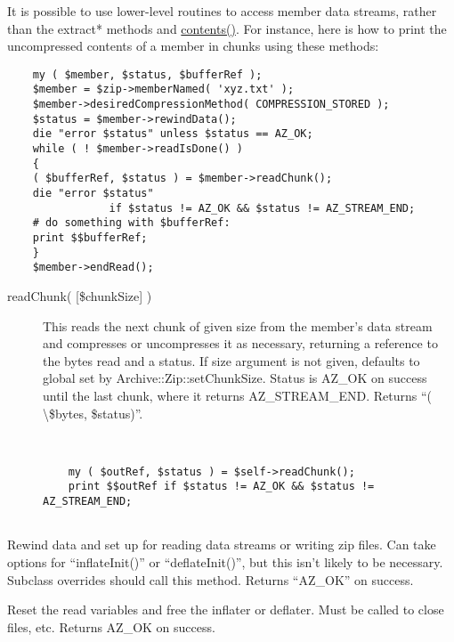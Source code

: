 \documentclass[]{article}
\renewcommand{\emph}[1]{\underline{#1}}
\begin{document}
It is possible to use lower-level routines to access member data
streams, rather than the extract* methods and \emph{contents()}. For
instance, here is how to print the uncompressed contents of a member in
chunks using these methods:

\begin{verbatim}
    my ( $member, $status, $bufferRef );
    $member = $zip->memberNamed( 'xyz.txt' );
    $member->desiredCompressionMethod( COMPRESSION_STORED );
    $status = $member->rewindData();
    die "error $status" unless $status == AZ_OK;
    while ( ! $member->readIsDone() )
    {
    ( $bufferRef, $status ) = $member->readChunk();
    die "error $status"
                if $status != AZ_OK && $status != AZ_STREAM_END;
    # do something with $bufferRef:
    print $$bufferRef;
    }
    $member->endRead();
\end{verbatim}

\begin{description}
\item[readChunk( {[}\$chunkSize{]} )]
This reads the next chunk of given size from the member's data stream
and compresses or uncompresses it as necessary, returning a reference to
the bytes read and a status. If size argument is not given, defaults to
global set by Archive::Zip::setChunkSize. Status is AZ\_OK on success
until the last chunk, where it returns AZ\_STREAM\_END. Returns ``(
\textbackslash{}\$bytes, \$status)''.

~

\begin{verbatim}
    my ( $outRef, $status ) = $self->readChunk();
    print $$outRef if $status != AZ_OK && $status != AZ_STREAM_END;
    
\end{verbatim}
\end{description}

\begin{description}
\itemsep1pt\parskip0pt
\item[\emph{rewindData()}]
Rewind data and set up for reading data streams or writing zip files.
Can take options for ``inflateInit()'' or ``deflateInit()'', but this
isn't likely to be necessary. Subclass overrides should call this
method. Returns ``AZ\_OK'' on success.
\end{description}

\begin{description}
\itemsep1pt\parskip0pt
\item[\emph{endRead()}]
Reset the read variables and free the inflater or deflater. Must be
called to close files, etc. Returns AZ\_OK on success.
\end{description}
\end{document}
